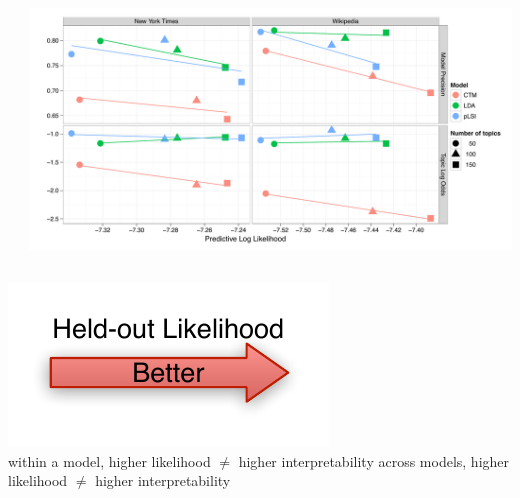 {\begin{columns}
\begin{flushright}
\end{flushright}
  \includegraphics[scale=\graphscale]{reading_tea_leaves/tasks/legend}
\end{columns}
\vspace{-0.75cm}
\begin{center}
  \includegraphics[scale=\graphscale]{reading_tea_leaves/tasks/held-out} \\
 {within a model, higher likelihood $\not =$ higher interpretability}
 {across models, higher likelihood $\not =$ higher interpretability}
\end{center}
}


